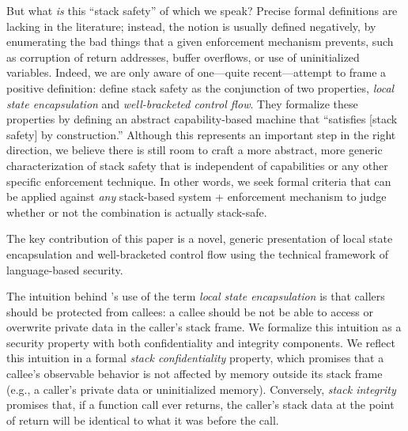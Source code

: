 \documentclass[acmsmall,review,anonymous]{acmart}\settopmatter{printfolios=true,printccs=false,printacmref=false}
\begin{document}
But what {\em is} this ``stack safety'' of which we speak? Precise formal
definitions are lacking in the literature; instead, the notion
is usually defined negatively, by enumerating the bad things that a given
enforcement mechanism
prevents, such as corruption of return addresses, buffer overflows, or
use of uninitialized variables.
Indeed, we are only aware of one---quite recent---attempt to frame a
positive definition:
\citet{Skorstengaard+19} define stack safety as
the conjunction of two properties, {\em local state encapsulation} and {\em
  well-bracketed control flow}.
They formalize these properties by defining an abstract capability-based machine
that ``satisfies [stack safety] by construction.''
%
Although this represents an important step in the right direction, we believe
there is still room to craft a more abstract, more generic characterization
of stack safety that is independent of capabilities or any other specific
enforcement
technique.  In other words, we seek formal criteria that can be applied
against \emph{any} stack-based system + enforcement mechanism to judge
whether or not the combination is actually stack-safe.

\iflater
{}
\fi
The key contribution of this paper is a novel, generic presentation of
local state encapsulation and well-bracketed control flow using the
technical framework of language-based security. 

The intuition behind \citeauthor{Skorstengaard+19}'s use of the term {\em
  local state encapsulation} is that callers should be protected from
callees: a callee should be not be able to access or overwrite private data
in the caller's stack frame. We formalize this intuition as a security
property with both confidentiality and integrity components.
%
We reflect this intuition in a formal
{\em stack confidentiality} property, which promises that a callee's
observable behavior is not affected by memory outside its stack frame
(e.g., a caller's private data or uninitialized memory).  Conversely, {\em stack
  integrity} promises that, if a function call ever returns, the caller's
stack data at the point of return will be identical to what it was before
the call.

\iflater
{}
\fi
\end{document}
